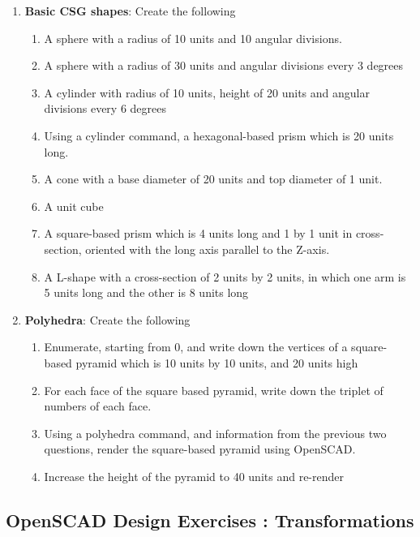 \begin{enumerate}
 \item \textbf{Basic CSG shapes}: Create the following
  \begin{enumerate}
    \item A sphere with a radius of 10 units and 10 angular divisions. 
    \item A sphere with a radius of 30 units and angular divisions every 3 degrees
    \item A cylinder with radius of 10 units, height of 20 units and angular divisions every 6 degrees
    \item Using a cylinder command, a hexagonal-based prism which is 20 units long. 
    \item A cone with a base diameter of 20 units and top diameter of 1 unit. 
    \item A unit cube 
    \item A square-based prism which is 4 units long and 1 by 1 unit in cross-section, oriented with the long axis parallel to the Z-axis. 
    \item A L-shape with a cross-section of 2 units by 2 units, in which one arm is 5 units long and the other is 8 units long
  \end{enumerate}
 \item \textbf{Polyhedra}: Create the following
  \begin{enumerate}
  \item Enumerate, starting from 0, and write down the vertices of a square-based pyramid which is 10 units by 10 units, and 20 units high 
  \item For each face of the square based pyramid, write down the triplet of numbers of each face. 
  \item Using a polyhedra command, and information from the previous two questions, render the square-based pyramid using OpenSCAD. 
  \item Increase the height of the pyramid to 40 units and re-render
  \end{enumerate}
\end{enumerate}

\newpage
\subsection{OpenSCAD Design Exercises : Transformations}

